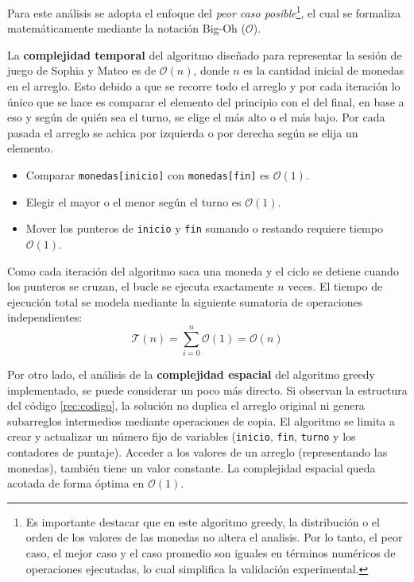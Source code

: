 Para este análisis se adopta el enfoque del \textit{peor caso posible}\footnote{Es importante destacar que en este algoritmo greedy, la distribución o el orden de los valores de las monedas no altera el analisis. Por lo tanto, el peor caso, el mejor caso y el caso promedio son iguales en términos numéricos de operaciones ejecutadas, lo cual simplifica la validación experimental.}, el cual se formaliza matemáticamente mediante la notación Big-Oh ($\mathcal{O}$).

La \textbf{complejidad temporal} del algoritmo diseñado para representar la sesión de juego de Sophia y Mateo es de $\mathcal{O}(n)$, donde $n$ es la cantidad inicial de monedas en el arreglo. Esto debido a que se recorre todo el arreglo y por cada iteración lo único que se hace es comparar el elemento del principio con el del final, en base a eso y según de quién sea el turno, se elige el más alto o el más bajo. Por cada pasada el arreglo se achica por izquierda o por derecha según se elija un elemento.

\begin{itemize}
    \item Comparar \verb|monedas[inicio]| con \verb|monedas[fin]| es $\mathcal{O}(1)$.
    \item Elegir el mayor o el menor según el turno es $\mathcal{O}(1)$.
    \item Mover los punteros de \verb|inicio| y \verb|fin| sumando o restando requiere tiempo $\mathcal{O}(1)$.
\end{itemize}


Como cada iteración del algoritmo saca una moneda y el ciclo se detiene cuando los punteros se cruzan, el bucle se ejecuta exactamente $n$ veces. El tiempo de ejecución total se modela mediante la siguiente sumatoria de operaciones independientes:
\begin{equation*} 
    \mathcal{T}(n) = \sum_{i=0}^{n} \mathcal{O}(1) = \mathcal{O}(n)
\end{equation*}

Por otro lado, el análisis de la \textbf{complejidad espacial} del algoritmo greedy implementado, se puede considerar un poco más directo. Si observan la estructura del código \ref{rec:codigo}, la solución no duplica el arreglo original ni genera subarreglos intermedios mediante operaciones de copia. El algoritmo se limita a crear y actualizar un número fijo de variables (\verb|inicio|, \verb|fin|, \verb|turno| y los contadores de puntaje). Acceder a los valores de un arreglo (representando las monedas), también tiene un valor constante.
La complejidad espacial queda acotada de forma óptima en $\mathcal{O}(1)$.

